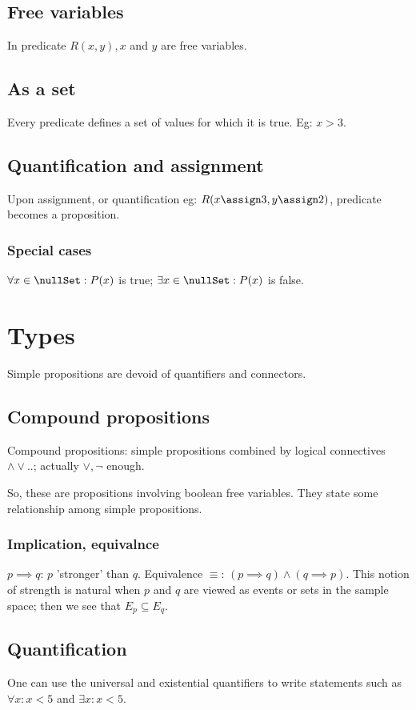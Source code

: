 \documentclass[oneside, article]{memoir}
\begin{document}
\subsection{Free variables}
In predicate $R(x, y), x$ and $y$ are free variables. 

\subsection{As a set}
Every predicate defines a set of values for which it is true. Eg: $x>3$.

\subsection{Quantification and assignment}
Upon assignment, or quantification eg: $R(x\assign 3, y \assign 2)$, predicate becomes a proposition.

\subsubsection{Special cases}
$\forall x \in \nullSet: P(x)$ is true; $\exists x \in \nullSet : P(x)$ is false.

\section{Types}
Simple propositions are devoid of quantifiers and connectors.

\subsection{Compound propositions}
Compound propositions: simple propositions combined by logical connectives $\land \lor ..$; actually $\lor, \lnot $ enough.

So, these are propositions involving boolean free variables.  They state some relationship among simple propositions.

\subsubsection{Implication, equivalnce}
$p \implies q$: $p$ 'stronger' than $q$. Equivalence $\equiv$: $(p \implies q) \land (q \implies p)$. This notion of strength is natural when $p$ and $q$ are viewed as events or sets in the sample space; then we see that $E_p \subseteq E_q$.

\subsection{Quantification}
One can use the universal and existential quantifiers to write statements such as $\forall x: x< 5$ and $\exists x: x< 5$.
\end{document}
